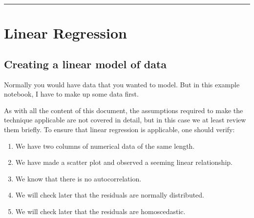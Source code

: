 \documentclass[letterpaper,10pt,english]{jupyterBook}
\begin{document}
\bigskip\hrule\bigskip



\section{Linear Regression}
\label{\detokenize{GB213-review-in-Python:linear-regression}}

\subsection{Creating a linear model of data}
\label{\detokenize{GB213-review-in-Python:creating-a-linear-model-of-data}}
\sphinxAtStartPar
Normally you would have data that you wanted to model.  But in this example notebook, I have to make up some data first.

\begin{sphinxVerbatim}[commandchars=\\\{\}]
   
      \PYG{p}{[}        \PYG{p}{]}  
       \PYG{p}{[}               \PYG{p}{]}   
 
\end{sphinxVerbatim}

\sphinxAtStartPar
As with all the content of this document, the assumptions required to make the technique applicable are not covered in detail, but in this case we at least review them briefly.  To ensure that linear regression is applicable, one should verify:
\begin{enumerate}
%
\item {} 
\sphinxAtStartPar
We have two columns of numerical data of the same length.

\item {} 
\sphinxAtStartPar
We have made a scatter plot and observed a seeming linear relationship.

\item {} 
\sphinxAtStartPar
We know that there is no autocorrelation.

\item {} 
\sphinxAtStartPar
We will check later that the residuals are normally distributed.

\item {} 
\sphinxAtStartPar
We will check later that the residuals are homoscedastic.

\end{enumerate}
\end{document}
